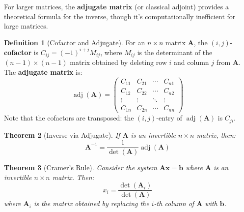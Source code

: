 \documentclass[12pt]{article}
\numberwithin{equation}{section}
\newcommand{\vect}[1]{\boldsymbol{#1}}   %
\newcommand{\mat}[1]{\mathbf{#1}}        %
\newcommand{\adj}{\operatorname{adj}}
\theoremstyle{plain}
\newtheorem{theorem}{Theorem}[section]
\theoremstyle{definition}
\newtheorem{definition}[theorem]{Definition}
\theoremstyle{remark}
\begin{document}
For larger matrices, the \textbf{adjugate matrix} (or classical adjoint) provides a theoretical formula for the inverse, though it's computationally inefficient for large matrices.

\begin{definition}[Cofactor and Adjugate]
For an $n \times n$ matrix $\mat{A}$, the $(i,j)$-\textbf{cofactor} is $C_{ij} = (-1)^{i+j}M_{ij}$, where $M_{ij}$ is the determinant of the $(n-1) \times (n-1)$ matrix obtained by deleting row $i$ and column $j$ from $\mat{A}$. The \textbf{adjugate matrix} is:
$$\adj(\mat{A}) = \begin{pmatrix} C_{11} & C_{21} & \cdots & C_{n1} \\ C_{12} & C_{22} & \cdots & C_{n2} \\ \vdots & \vdots & \ddots & \vdots \\ C_{1n} & C_{2n} & \cdots & C_{nn} \end{pmatrix}$$
Note that the cofactors are transposed: the $(i,j)$-entry of $\adj(\mat{A})$ is $C_{ji}$.
\end{definition}

\begin{theorem}[Inverse via Adjugate]
If $\mat{A}$ is an invertible $n \times n$ matrix, then:
$$\mat{A}^{-1} = \frac{1}{\det(\mat{A})}\adj(\mat{A})$$
\end{theorem}

\begin{theorem}[Cramer's Rule]
Consider the system $\mat{A}\vect{x} = \vect{b}$ where $\mat{A}$ is an invertible $n \times n$ matrix. Then:
$$x_i = \frac{\det(\mat{A}_i)}{\det(\mat{A})}$$
where $\mat{A}_i$ is the matrix obtained by replacing the $i$-th column of $\mat{A}$ with $\vect{b}$.
\end{theorem}
\end{document}

